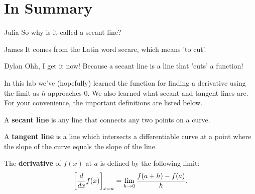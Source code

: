 \documentclass{ximera}
\begin{document}
\section{In Summary}
\begin{dialogue}
\item[Julia] So why is it called a secant line?
\item[James] It comes from the Latin word secare, which means 'to cut'.
\item[Dylan] Ohh, I get it now! Because a secant line is a line that 'cuts' a function!
\end{dialogue}
In this lab we've (hopefully) learned the function for finding a derivative using the limit as $h$ approaches 0. We also learned what secant and tangent lines are. For your convenience, the important definitions are listed below.
\begin{definition}
 A \textbf{secant line} is any line that connects any two points on a curve.
\end{definition}
\begin{definition}
A \textbf{tangent line} is a line which intersects a differentiable curve at a point where the slope of the curve equals the slope of the line.
\end{definition}
\begin{definition}
  The \textbf{derivative} of $f(x)$ at $a$ is defined by the following limit:
  \[
  \bigg[ \frac{d}{dx} f(x) \bigg]_{x=a} = \lim_{h\to 0} \frac{f(a+h) - f(a)}{h}.
  \]
\end{definition}
\end{document}
